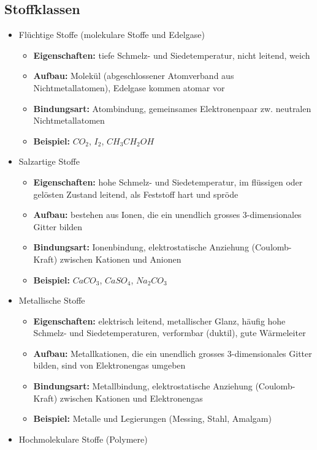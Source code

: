\subsection{Stoffklassen}
\begin{itemize}
	\item Flüchtige Stoffe (molekulare Stoffe und Edelgase)
	\begin{itemize}
	    \item \textbf{Eigenschaften:} tiefe Schmelz- und Siedetemperatur, nicht leitend, weich
	    \item \textbf{Aufbau:} Molekül (abgeschlossener Atomverband aus Nichtmetallatomen), Edelgase kommen atomar vor
	    \item \textbf{Bindungsart:} Atombindung, gemeinsames Elektronenpaar zw. neutralen Nichtmetallatomen
	    \item \textbf{Beispiel:} $CO_2$, $I_2$, $CH_3CH_2OH$
	\end{itemize}
	\item Salzartige Stoffe
	\begin{itemize}
	    \item \textbf{Eigenschaften:} hohe Schmelz- und Siedetemperatur, im flüssigen oder gelösten Zustand leitend, als Feststoff hart und spröde
	    \item \textbf{Aufbau:} bestehen aus Ionen, die ein unendlich grosses 3-dimensionales Gitter bilden
	    \item \textbf{Bindungsart:} Ionenbindung, elektrostatische Anziehung (Coulomb-Kraft) zwischen Kationen und Anionen
	    \item \textbf{Beispiel:} $CaCO_3$, $CaSO_4$, $Na_2CO_3$
	\end{itemize}
	\item Metallische Stoffe
	\begin{itemize}
	    \item \textbf{Eigenschaften:} elektrisch leitend, metallischer Glanz, häufig hohe Schmelz- und Siedetemperaturen, verformbar (duktil), gute Wärmeleiter
	    \item \textbf{Aufbau:} Metallkationen, die ein unendlich grosses 3-dimensionales Gitter bilden, sind von Elektronengas umgeben
	    \item \textbf{Bindungsart:} Metallbindung, elektrostatische Anziehung (Coulomb-Kraft) zwischen Kationen und Elektronengas
	    \item \textbf{Beispiel:} Metalle und Legierungen (Messing, Stahl, Amalgam)
	\end{itemize}
	\item Hochmolekulare Stoffe (Polymere)

\end{itemize}

